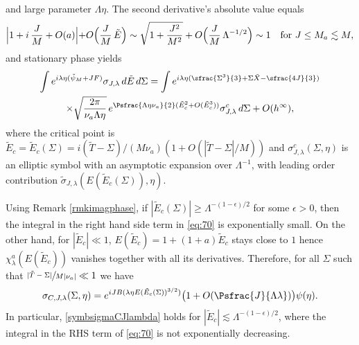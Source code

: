 and large parameter $\Lambda\eta$. The second derivative's absolute value equals
\[
\Bigl|1+i\,\frac JM+O(a)\Bigl|+O\Bigl(\frac JM\, {\tilde E}\Bigr)\sim \sqrt{1+\frac{J^2}{M^2}}+O\Bigl(\frac JM\, \Lambda^{-1/2}\Bigr)\sim 1\quad\text{for }J\leq M_a\lesssim M,
\]
and stationary phase yields
\begin{multline}
\label{eq:70}
\int e^{i \lambda\eta (\tilde\psi_{M}+JF)}\sigma_{J,\lambda } \,d{\tilde E} \,d\Sigma = \int e^{i \lambda\eta (\sfrac{\Sigma^3}{3}+\Sigma \tilde X-\sfrac{4J}{3})} \\
\times \sqrt{\frac{2\pi}{\nu_a \Lambda\eta}}\, e^{\Psfrac{\Lambda\eta\nu_a}{2}({\tilde E}^{2}_{c}+O({\tilde E}_{c}^{3}))}\sigma^{c}_{J,\lambda}\,d\Sigma+O(h^{\infty}),
\end{multline}
where the critical point is ${\tilde E}_{c}=\tilde E_c(\Sigma)=i(\tilde T-\Sigma)/(M\nu_a) (1+O(|\tilde T-\Sigma|/M))$ and $\sigma^{c}_{J,\lambda}(\Sigma,\eta)$ is an elliptic symbol with an asymptotic expansion over $\Lambda^{-1}$, with leading order contribution $\tilde \sigma_{J,\lambda}(E(\tilde E_{c}(\Sigma)),\eta)$.

\begin{rmq}\label{rmqsymbC}
Using Remark \ref{rmkimagphase}, if $|\tilde E_c(\Sigma)|\geq \Lambda^{-(1-\epsilon)/2}$ for some $\epsilon>0$, then the integral in the right hand side term in \eqref{eq:70} is exponentially small. On the other hand, for $|\tilde E_c|\ll 1$, $E(\tilde E_c)=1+(1+a)\tilde E_c$ stays close to $1$ hence $\chi^a_{\lambda}(E(\tilde E_c))$ vanishes together with all its derivatives. Therefore, for all $\Sigma$ such that $\sfrac{|\tilde T-\Sigma|}{M|\nu_a|}\ll 1$ we have
\begin{equation}\label{symbsigmaCJlambda}
\sigma_{C,J,\lambda}(\Sigma,\eta)=e^{iJB(\lambda\eta E(\tilde E_c(\Sigma))^{3/2})}\bigl(1+O(\Psfrac{J}{\Lambda\lambda})\bigr)\psi(\eta).
\end{equation}
In particular, \eqref{symbsigmaCJlambda} holds for $|\tilde E_c|\lesssim \Lambda^{-(1-\epsilon)/2}$, \ie where the integral in the RHS term of \eqref{eq:70} is not exponentially decreasing.
\end{rmq}

